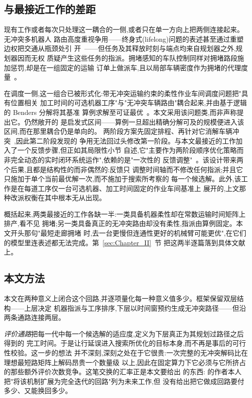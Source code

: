 \documentclass[manuscript,screen,review]{acmart}
\begin{document}
\subsection{与最接近工作的差距}

现有工作或者每次只处理这一耦合的一侧,或者只在单一方向上把两侧连接起来。无冲突多机器人
路由高度重视争用——终身式(lifelong)问题的表述甚至通过重塑边权把交通从瓶颈处引
开~\cite{zhang2024guidance}——但任务及其释放时刻与端点均来自规划器之外,规划器因而无权
质疑产生这些任务的指派。拥堵感知的车队控制同样对拥堵路段施加惩罚,却是在一组固定的运输
订单上做派车,且以局部车辆密度作为拥堵的代理度量~\cite{kim2026congestion}。

在调度一侧,这一组合已被形式化:带无冲突运输约束的柔性作业车间调度问题把"具有位置相关
加工时间的可选机器工序"与"无冲突车辆路由"耦合起来,并由基于逻辑的 Benders 分解将其基准
算例求解至可证最优~\cite{vanos2026exact}。本文采用该问题类,而非声称提出它。仍然敞开的
是启发式区间——算例一旦超出精确分解可及的规模便进入该区间,而在那里耦合仍是单向的。
两阶段方案先固定排程、再针对它消解车辆冲突~\cite{sun2023integrated},因此第二阶段发现的
争用无法回过头修改第一阶段。与本文最接近的工作加入了一个反馈步骤,但正如其局限性小节
自述,它"主要作为两阶段顺序优化策略而非完全动态的实时闭环系统运作",依赖的是"一次性的
反馈调整"~\cite{li2026framework}。该设计带来两个后果,且都是结构性的而非偶然的:反馈只
调整时间轴而不修改任何指派;并且它只施加于单个当前最优解一次,而不施加于搜索所考察的
每一个候选解。此外,该工作是在每道工序仅一台可选机器、加工时间固定的作业车间基准上
展开的,上文那种改派权衡在其中根本无从出现。

概括起来,两类最接近的工作各缺一半:一类具备机器柔性却在常数运输时间矩阵上排产,看不见
拥堵;另一类具备真正的无冲突路由却没有柔性,指派由算例固定。本文开头那句"最短走廊拥堵
时,去一台更慢但连通性更好的机械臂可能更优",在它们的模型里连表述都无法完成。第~\ref{sec:Chapter_II}~节
把这两半逐篇落到具体文献上。

\subsection{本文方法}

本文在两种意义上闭合这个回路,并逐项量化每一种意义值多少。框架保留双层结构——上层决定
机器指派与工序排序,下层以时间窗预约生成无冲突路径——但沿两条通路连接两层。

\emph{评价通路}把每一代中每一个候选解的适应度,定义为下层真正为其规划过路径之后得到的
完工时间。于是让行延误进入搜索所优化的目标本身,而不再是事后的可行性校验。这一步的想法
并不深刻,深刻之处在于它很贵:一次完整的无冲突解码比在理想最短路矩阵上解码昂贵一个数量级
以上,因此在固定算力下它必须与它所挤占的那些额外评价次数竞争。这笔交换的汇率正是本文要给出
的东西:\cite{li2026framework} 的作者本人把"将该机制扩展为完全迭代的回路"列为未来工作,但
没有给出把它做成回路要付多少、又能换回多少。
\end{document}
